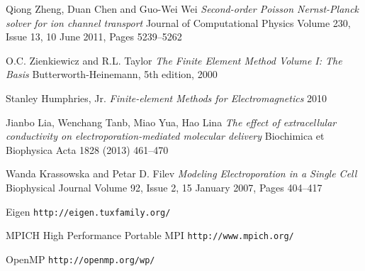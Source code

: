 \documentclass[a4paper,spanish]{article}
\begin{document}
\begin{thebibliography}{9}



	Qiong Zheng, Duan Chen and Guo-Wei Wei
	\emph{Second-order Poisson Nernst-Planck solver for ion channel transport}
	Journal of Computational Physics
	Volume 230, Issue 13, 10 June 2011, Pages 5239–5262

	O.C. Zienkiewicz and R.L. Taylor
	\emph{The Finite Element Method Volume I: The Basis}
	Butterworth-Heinemann,
	5th edition,
	2000

	Stanley Humphries, Jr.
	\emph{Finite-element Methods for Electromagnetics}
	2010

	Jianbo Lia, Wenchang Tanb, Miao Yua, Hao Lina
	\emph{The effect of extracellular conductivity on electroporation-mediated molecular delivery}
	Biochimica et Biophysica Acta 
	1828 (2013) 461–470
	
	Wanda Krassowska and Petar D. Filev
	\emph{Modeling Electroporation in a Single Cell}
	Biophysical Journal
	Volume 92, Issue 2, 15 January 2007, Pages 404–417

	Eigen \texttt{http://eigen.tuxfamily.org/}
	
	MPICH High Performance Portable MPI \texttt{http://www.mpich.org/}
	
	OpenMP \texttt{http://openmp.org/wp/}


\end{thebibliography}
\end{document}

